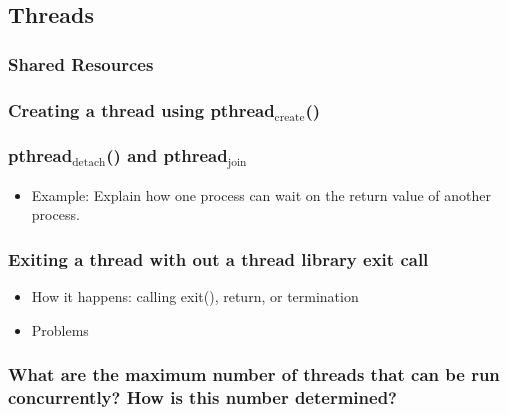 \documentclass[11pt]{article}
\begin{document}
\subsection{Threads}
\label{sec-6.2}

\subsubsection{Shared Resources}
\label{sec-6.2.1}

\subsubsection{Creating a thread using pthread$_{\mathrm{create}}$()}
\label{sec-6.2.2}

\subsubsection{pthread$_{\mathrm{detach}}$() and pthread$_{\mathrm{join}}$}
\label{sec-6.2.3}

\begin{itemize}

\item Example: Explain how one process can wait on the return value of another process.\\
\label{sec-6.2.3.1}

\end{itemize} %
\subsubsection{Exiting a thread with out a thread library exit call}
\label{sec-6.2.4}

\begin{itemize}

\item How it happens: calling exit(), return, or termination\\
\label{sec-6.2.4.1}


\item Problems\\
\label{sec-6.2.4.2}

\end{itemize} %
\subsubsection{What are the maximum number of threads that can be run concurrently? How is this number determined?}
\label{sec-6.2.5}
\end{document}
